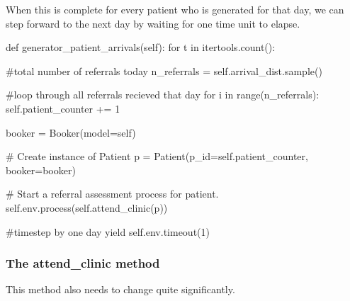 \documentclass[
  letterpaper,
  DIV=11,
  numbers=noendperiod]{scrreprt}
\newenvironment{Shaded}{\begin{snugshade}}{\end{snugshade}}
\newcommand{\BuiltInTok}[1]{\textcolor[rgb]{0.00,0.23,0.31}{#1}}
\newcommand{\CommentTok}[1]{\textcolor[rgb]{0.37,0.37,0.37}{#1}}
\newcommand{\ControlFlowTok}[1]{\textcolor[rgb]{0.00,0.23,0.31}{#1}}
\newcommand{\DecValTok}[1]{\textcolor[rgb]{0.68,0.00,0.00}{#1}}
\newcommand{\KeywordTok}[1]{\textcolor[rgb]{0.00,0.23,0.31}{#1}}
\newcommand{\NormalTok}[1]{\textcolor[rgb]{0.00,0.23,0.31}{#1}}
\newcommand{\OperatorTok}[1]{\textcolor[rgb]{0.37,0.37,0.37}{#1}}
\newcommand{\VariableTok}[1]{\textcolor[rgb]{0.07,0.07,0.07}{#1}}
\begin{document}
When this is complete for every patient who is generated for that day,
we can step forward to the next day by waiting for one time unit to
elapse.

\begin{Shaded}
\begin{Highlighting}[]
\KeywordTok{def}\NormalTok{ generator\_patient\_arrivals(}\VariableTok{self}\NormalTok{):}
    \ControlFlowTok{for}\NormalTok{ t }\KeywordTok{in}\NormalTok{ itertools.count():}

        \CommentTok{\#total number of referrals today}
\NormalTok{        n\_referrals }\OperatorTok{=} \VariableTok{self}\NormalTok{.arrival\_dist.sample()}

        \CommentTok{\#loop through all referrals recieved that day}
        \ControlFlowTok{for}\NormalTok{ i }\KeywordTok{in} \BuiltInTok{range}\NormalTok{(n\_referrals):}
            \VariableTok{self}\NormalTok{.patient\_counter }\OperatorTok{+=} \DecValTok{1}

\NormalTok{            booker }\OperatorTok{=}\NormalTok{ Booker(model}\OperatorTok{=}\VariableTok{self}\NormalTok{)}

            \CommentTok{\# Create instance of Patient}
\NormalTok{            p }\OperatorTok{=}\NormalTok{ Patient(p\_id}\OperatorTok{=}\VariableTok{self}\NormalTok{.patient\_counter, booker}\OperatorTok{=}\NormalTok{booker)}

            \CommentTok{\# Start a referral assessment process for patient.}
            \VariableTok{self}\NormalTok{.env.process(}\VariableTok{self}\NormalTok{.attend\_clinic(p))}

        \CommentTok{\#timestep by one day}
        \ControlFlowTok{yield} \VariableTok{self}\NormalTok{.env.timeout(}\DecValTok{1}\NormalTok{)}
\end{Highlighting}
\end{Shaded}

\subsubsection{The attend\_clinic
method}\label{the-attend_clinic-method-6}

This method also needs to change quite significantly.
\end{document}
